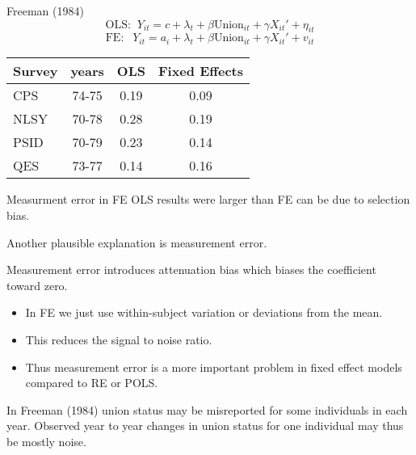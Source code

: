 \documentclass{beamer}
\begin{document}
\begin{frame}{Freeman (1984)}
\[\text{OLS: }\ Y_{it} = c + \lambda_t + \beta \text{Union}_{it} + \gamma X_{it}' + \eta_{it}\]
\[\text{FE: }\ \ Y_{it} = a_i + \lambda_t + \beta \text{Union}_{it} + \gamma X_{it}' + v_{it}\]
\begin{table}
\centering
\begin{tabular}{lccc}
\hline\hline
Survey&years& OLS& Fixed Effects\\
\hline
CPS &74-75 &0.19& 0.09\\
NLSY& 70-78& 0.28& 0.19\\
PSID& 70-79& 0.23 &0.14\\
QES& 73-77 &0.14& 0.16\\
\hline
\end{tabular}
\end{table}

\end{frame}

\begin{frame}{Measurment error in FE}
OLS results were larger than FE can be due to selection bias.\bigskip

Another plausible explanation is measurement error.\bigskip

Measurement error introduces attenuation bias which biases the coefficient toward zero. 
\begin{itemize}
\item In FE we just use within-subject variation or deviations from the mean.
\item This reduces the signal to noise ratio.
\item Thus measurement error is a more important problem in fixed effect models compared to RE or POLS.
\end{itemize}

In Freeman (1984) union status may be misreported for some individuals in each year. Observed year to year changes in union status for one individual may thus be mostly noise.
\end{frame}
\end{document}
